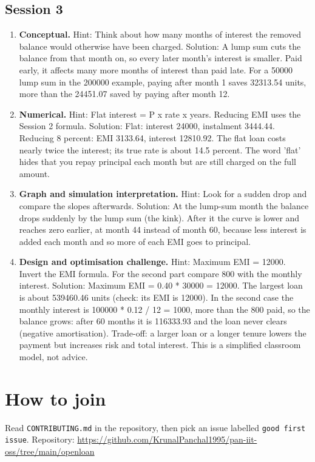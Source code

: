 \documentclass[11pt,a4paper]{article}
\begin{document}
\subsection*{Session 3}
\begin{enumerate}[nosep]
\item \textbf{Conceptual.} Hint: Think about how many months of interest the removed balance would otherwise have been charged. Solution: A lump sum cuts the balance from that month on, so every later month's interest is smaller. Paid early, it affects many more months of interest than paid late. For a 50000 lump sum in the 200000 example, paying after month 1 saves 32313.54 units, more than the 24451.07 saved by paying after month 12.
\item \textbf{Numerical.} Hint: Flat interest = P x rate x years. Reducing EMI uses the Session 2 formula. Solution: Flat: interest 24000, instalment 3444.44. Reducing 8 percent: EMI 3133.64, interest 12810.92. The flat loan costs nearly twice the interest; its true rate is about 14.5 percent. The word 'flat' hides that you repay principal each month but are still charged on the full amount.
\item \textbf{Graph and simulation interpretation.} Hint: Look for a sudden drop and compare the slopes afterwards. Solution: At the lump-sum month the balance drops suddenly by the lump sum (the kink). After it the curve is lower and reaches zero earlier, at month 44 instead of month 60, because less interest is added each month and so more of each EMI goes to principal.
\item \textbf{Design and optimisation challenge.} Hint: Maximum EMI = 12000. Invert the EMI formula. For the second part compare 800 with the monthly interest. Solution: Maximum EMI = 0.40 * 30000 = 12000. The largest loan is about 539460.46 units (check: its EMI is 12000). In the second case the monthly interest is 100000 * 0.12 / 12 = 1000, more than the 800 paid, so the balance grows: after 60 months it is 116333.93 and the loan never clears (negative amortisation). Trade-off: a larger loan or a longer tenure lowers the payment but increases risk and total interest. This is a simplified classroom model, not advice.
\end{enumerate}

\section{How to join}
Read \texttt{CONTRIBUTING.md} in the repository, then pick an issue labelled \texttt{good first issue}. Repository: \url{https://github.com/KrunalPanchal1995/pan-iit-oss/tree/main/openloan}
\end{document}
